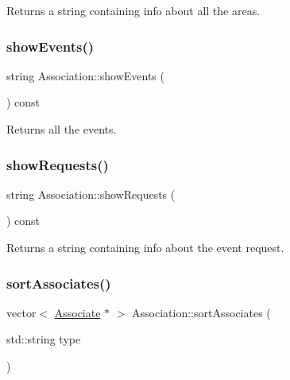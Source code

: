 Returns a string containing info about all the areas. 

\mbox{\label{classAssociation_aff3817596c302056ca73ca6a98e7bf3c}} 
\subsubsection{\texorpdfstring{show\+Events()}{showEvents()}}
{\footnotesize\ttfamily string Association\+::show\+Events (\begin{DoxyParamCaption}{ }\end{DoxyParamCaption}) const}



Returns all the events. 

\mbox{\label{classAssociation_a7d743e480f5dbba9189a40d17b931121}} 
\subsubsection{\texorpdfstring{show\+Requests()}{showRequests()}}
{\footnotesize\ttfamily string Association\+::show\+Requests (\begin{DoxyParamCaption}{ }\end{DoxyParamCaption}) const}



Returns a string containing info about the event request. 

\mbox{\label{classAssociation_a89d561169e68f61edd79cbef11bae683}} 
\subsubsection{\texorpdfstring{sort\+Associates()}{sortAssociates()}}
{\footnotesize\ttfamily vector$<$ \mbox{\hyperlink{classAssociate}{Associate}} $\ast$ $>$ Association\+::sort\+Associates (\begin{DoxyParamCaption}\item[{std\+::string}]{type }\end{DoxyParamCaption})}



